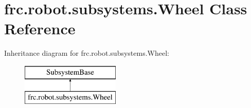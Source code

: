 \hypertarget{classfrc_1_1robot_1_1subsystems_1_1_wheel}{}\section{frc.\+robot.\+subsystems.\+Wheel Class Reference}
\label{classfrc_1_1robot_1_1subsystems_1_1_wheel}
Inheritance diagram for frc.\+robot.\+subsystems.\+Wheel\+:\begin{figure}[H]
\begin{center}
\leavevmode
\includegraphics[height=2.000000cm]{classfrc_1_1robot_1_1subsystems_1_1_wheel}
\end{center}
\end{figure}
